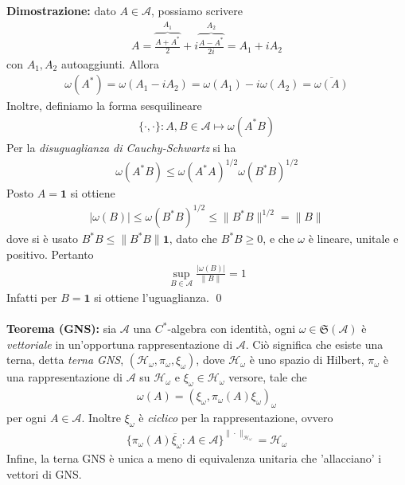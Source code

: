 \documentclass{article}
\numberwithin{equation}{subsection}
\begin{document}
\textbf{Dimostrazione:} dato $A \in \mathscr{A}$, possiamo scrivere
\begin{align*}
    A = \overbrace{\frac{A + A^*}{2}}^{A_1} + i\overbrace{\frac{A - A^*}{2i}}^{A_2} = A_1 + iA_2
\end{align*}
con $A_1, A_2$ autoaggiunti. Allora
\begin{align*}
    \omega(A^*) = \omega(A_1 - iA_2) = \omega(A_1) - i\omega(A_2) = \overline{\omega(A)}
\end{align*}
Inoltre, definiamo la forma sesquilineare
\begin{align*}
    \{\cdot, \cdot\} : A, B \in \mathscr{A} \mapsto \omega(A^*B)
\end{align*}
Per la \textit{disuguaglianza di Cauchy-Schwartz} si ha
\begin{align*}
    \omega(A^*B) \leq \omega(A^*A)^{1/2}\omega(B^*B)^{1/2}
\end{align*}
Posto $A = \mathbf{1}$ si ottiene
\begin{align*}
    |\omega(B)| \leq \omega(B^*B)^{1/2} \leq \|B^*B\|^{1/2} = \|B\|
\end{align*}
dove si è usato $B^*B \leq \|B^*B\|\mathbf{1}$, dato che $B^*B \geq 0$, e che $\omega$ è lineare, unitale e positivo. Pertanto
\begin{align*}
    \sup_{B \in \mathscr{A}} \frac{|\omega(B)|}{\|B\|} = 1
\end{align*}
Infatti per $B = \mathbf{1}$ si ottiene l'uguaglianza. \qed \\ \\
\textbf{Teorema (GNS):} sia $\mathscr{A}$ una $C^*$-algebra con identità, ogni $\omega \in \mathfrak{S}(\mathscr{A})$ è \textit{vettoriale} in un'opportuna rappresentazione di $\mathscr{A}$. Ciò significa che esiste una terna, detta \textit{terna GNS}, $(\mathcal{H}_\omega, \pi_\omega, \xi_\omega)$, dove $\mathcal{H}_\omega$ è uno spazio di Hilbert, $\pi_\omega$ è una rappresentazione di $\mathscr{A}$ su $\mathcal{H}_\omega$ e $\xi_\omega \in \mathcal{H}_\omega$ versore, tale che
\begin{align*}
    \omega(A) = (\xi_\omega, \pi_\omega(A)\xi_\omega)_\omega
\end{align*}
per ogni $A \in \mathscr{A}$. Inoltre $\xi_\omega$ è \textit{ciclico} per la rappresentazione, ovvero
\begin{align*}
    \overline{\{\pi_\omega(A)\xi_\omega : A \in \mathscr{A}\}}^{\|\cdot\|_{\mathcal{H}_\omega}} = \mathcal{H}_\omega
\end{align*}
Infine, la terna GNS è unica a meno di equivalenza unitaria che 'allacciano' i vettori di GNS. \\
\end{document}
